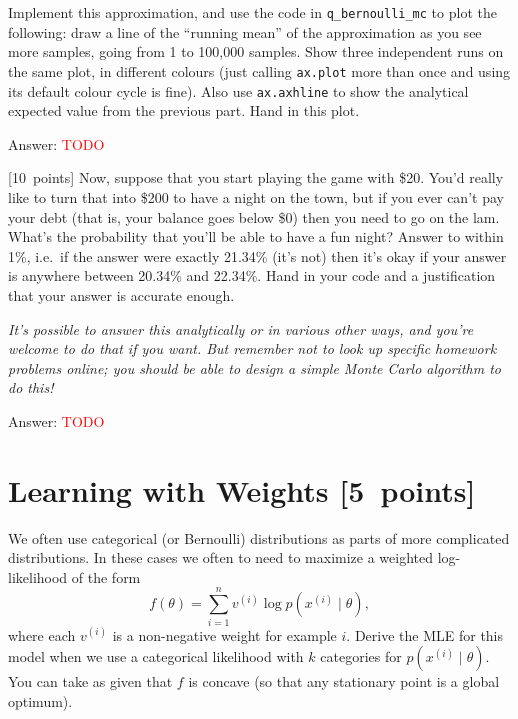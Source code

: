 \documentclass{article}
\newcommand{\ask}[1]{\textcolor{question}{#1}}
\newenvironment{answer}{\par\begingroup\color{answer}Answer: }{\endgroup}
\newcommand{\red}[1]{\textcolor{red}{#1}}
\newcommand{\pts}[1]{\textcolor{points}{[#1~points]}}
\newcommand{\meta}[1]{\textcolor{black!60!white}{\emph{#1}}}
\newcommand{\TODO}{\red{TODO}}
\newcommand{\toth}[1]{^{(#1)}}
\newcommand{\ith}{\toth{i}}
\begin{document}
\begin{qlist}
    Implement this approximation, and use the code in \texttt{q\_bernoulli\_mc} to plot the following:
    draw a line of the ``running mean'' of the approximation as you see more samples,
    going from 1 to 100,000 samples.
    Show three independent runs on the same plot, in different colours
    (just calling \texttt{ax.plot} more than once and using its default colour cycle is fine).
    Also use \texttt{ax.axhline} to show the analytical expected value from the previous part.
    \ask{Hand in this plot.}

\begin{answer}\TODO\end{answer}


\item \pts{10}
    Now, suppose that you start playing the game with \$20.
    You'd really like to turn that into \$200 to have a night on the town,
    but if you ever can't pay your debt (that is, your balance goes below \$0)
    then you need to go on the lam.
    What's the probability that you'll be able to have a fun night?
    \ask{Answer to within 1\%}, i.e.\ if the answer were exactly 21.34\% (it's not)
    then it's okay if your answer is anywhere between 20.34\% and 22.34\%.
    \ask{Hand in your code and a justification that your answer is accurate enough.}

    \meta{It's possible to answer this analytically or in various other ways, and you're welcome to do that if you want. But remember not to look up specific homework problems online; you should be able to design a simple Monte Carlo algorithm to do this!}

\begin{answer}\TODO\end{answer}



\end{qlist}


\clearpage
\section{Learning with Weights \pts{5}}


    We often use categorical (or Bernoulli) distributions as parts of more complicated distributions. In these cases we often to need to maximize a weighted log-likelihood of the form
    \[
    f(\theta) = \sum_{i=1}^n v\ith \log p(x\ith \mid \theta),
    \]
    where each $v\ith$ is a non-negative weight for example $i$.
    \ask{Derive the MLE for this model when we use a categorical likelihood with $k$ categories for $p(x\ith \mid \theta)$.}
    You can take as given that $f$ is concave (so that any stationary point is a global optimum).
\end{document}
